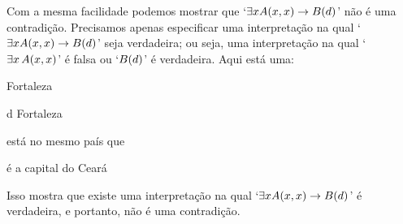 Com a mesma facilidade podemos mostrar que `$\exists x\mathord{A}(x,x) \rightarrow \mathord{B}(d)$' não é uma contradição.
Precisamos apenas especificar uma interpretação na qual `$\exists x\mathord{A}(x,x) \rightarrow \mathord{B}(d)$' seja verdadeira; ou seja, uma interpretação na qual `$\exists x\, \mathord{A}(x,x)$' é falsa ou `$\mathord{B}(d)$' é verdadeira.
Aqui está uma:
\begin{center}
	\begin{ekey}
		\item[\text{domínio}] Fortaleza
		\item[d] Fortaleza
		\item[\atom{A}{x,y}]  está no mesmo país que 
		\item[\atom{B}{x}]  é a capital do Ceará
	\end{ekey}
\end{center}
Isso mostra que existe uma interpretação na qual `$\exists x\mathord{A}(x,x) \rightarrow \mathord{B}(d)$' é verdadeira, e portanto, não é uma contradição.


